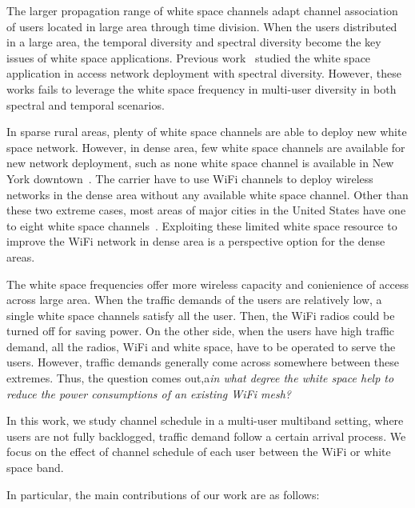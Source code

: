 The larger propagation range of white space channels adapt channel association of users located 
in large area through time division. When the users distributed in a large area, the temporal 
diversity and spectral diversity become the key issues of white space applications.
Previous work~\cite{pcuiwinmee} studied the white space application in access network deployment 
with spectral diversity. However, these works fails to leverage the white space frequency in 
multi-user diversity in both spectral and temporal scenarios.

In sparse rural areas, plenty of white space channels are able to deploy new white space network. However, 
in dense area, few white space channels are available for new network deployment, such as none white 
space channel is available in New York downtown~\cite{googlespectrum}. The carrier have to use WiFi 
channels to deploy wireless networks in the dense area without any available white space channel. 
Other than these two extreme cases, most areas of major cities in the United States have one to eight 
white space channels~\cite{googlespectrum}. Exploiting these limited white space resource to improve 
the WiFi network in dense area is a perspective option for the dense areas.

The white space frequencies offer more wireless capacity and conienience of access across large 
area. When the traffic demands of the users are relatively low, a single white space channels satisfy 
all the user. Then, the WiFi radios could be turned off for saving power. On the other side, 
when the users have high traffic demand, all the radios, WiFi and white space, have to be operated to serve the users. 
However, traffic demands generally come across somewhere between these extremes.
Thus, the question comes out,a{\it in what degree the white space help to reduce the power consumptions of 
an existing WiFi mesh?} 

In this work, we study channel schedule in a multi-user multiband setting, where users are not 
fully backlogged, traffic demand follow a certain arrival process. We focus on the effect of channel 
schedule of each user between the WiFi or white space band. 


In particular, the main contributions of our work are as follows:
%

